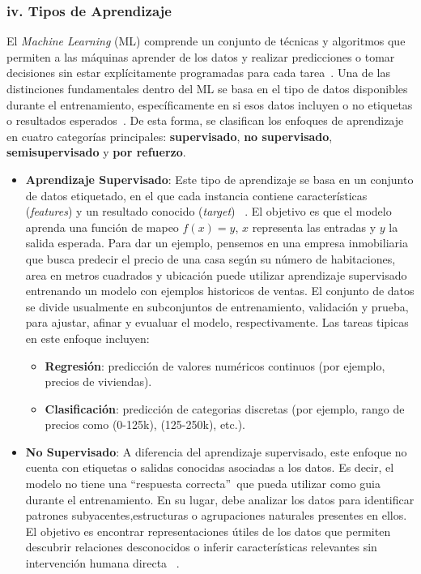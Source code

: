 \documentclass[11pt]{article} %
\begin{document}
\subsubsection{iv. Tipos de Aprendizaje}
El \textit{Machine Learning} (ML) comprende un conjunto de técnicas y algoritmos que permiten a las máquinas aprender de los datos y realizar predicciones o tomar decisiones sin estar explícitamente programadas para cada tarea~\cite{elementosIA}. Una de las distinciones fundamentales dentro del ML se basa en el tipo de datos disponibles durante el entrenamiento, específicamente en si esos datos incluyen o no etiquetas o resultados esperados~\cite{sanchez}. De esta forma, se clasifican los enfoques de aprendizaje en cuatro categorías principales: \textbf{supervisado}, \textbf{no supervisado}, \textbf{semisupervisado} y \textbf{por refuerzo}.
\begin{itemize}
    \item \textbf{Aprendizaje Supervisado}: Este tipo de aprendizaje se basa en un conjunto de datos etiquetado, en el que cada instancia contiene características (\textit{features}) y un resultado conocido (\textit{target}) ~\cite{choi2020introduction}. El objetivo es que el modelo aprenda una función de mapeo $f(x) = y$, $x$ representa las entradas y $y$ la salida esperada. Para dar un ejemplo, pensemos en una empresa inmobiliaria que busca predecir el precio de una casa según su número de habitaciones, area en metros cuadrados y ubicación puede utilizar aprendizaje supervisado entrenando un modelo con ejemplos historicos de ventas. El conjunto de datos se divide usualmente en subconjuntos de entrenamiento, validación y prueba, para ajustar, afinar y evualuar el modelo, respectivamente. Las tareas tipicas en este enfoque incluyen:
    \begin{itemize}
    \item\textbf{Regresión}: predicción de valores numéricos continuos (por ejemplo, precios de viviendas).
    \item\textbf{Clasificación}: predicción de categorias discretas (por ejemplo, rango de precios como (0-125k), (125-250k), etc.).    
    \end{itemize}
    \item \textbf{No Supervisado}: A diferencia del aprendizaje supervisado, este enfoque no cuenta con etiquetas o salidas conocidas asociadas a los datos. Es decir, el modelo no tiene una \textquotedblleft respuesta correcta\textquotedblright~que pueda utilizar como guia durante el entrenamiento. En su lugar, debe analizar los datos para identificar patrones subyacentes,estructuras o agrupaciones naturales presentes en ellos. El objetivo es encontrar representaciones útiles de los datos que permiten descubrir relaciones desconocidos o inferir características relevantes sin intervención humana directa ~\cite{choi2020introduction}. \\[2pt]

\end{itemize}
\end{document}

